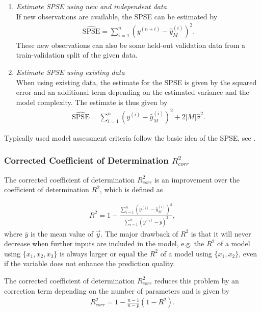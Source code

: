 \begin{enumerate}

	\item \emph{Estimate SPSE using new and independent data} \\	
	If new observations are available, the SPSE can be estimated by
	\begin{align}
		\widehat{\text{SPSE}} = \sum_{i=1}^n \left(y^{(n+i)} - \hat y^{(i)}_M\right)^2.
	\end{align}
	These new observations can also be some held-out validation data from a train-validation split of the given data. 
	
	\item \emph{Estimate SPSE using existing data} \\
	When using existing data, the estimate for the SPSE is given by the squared error and an additional  term depending on the estimated variance and the model complexity. The estimate is thus given by
	\begin{align}
		\widehat{\text{SPSE}} = \sum_{i=1}^n \left(y^{(i)} - \hat y^{(i)}_M\right)^2 + 2\vert M \vert \hat \sigma^2.
	\end{align}

\end{enumerate}

Typically used model assessment criteria follow the basic idea of the SPSE, see \cite{fahrmeir2007regression}.

\subsubsection{Corrected Coefficient of Determination $R_{corr}^2$}

The corrected coefficient of determination $R^2_{corr}$ is an improvement over the coefficient of determination $R^2$, which is defined as 

\begin{align}
	R^2 = 1 - \frac{\sum_{i=1}^n \left( y^{(i)} - \hat y^{(i)}_M \right)^2}{\sum_{i=1}^n \left(y^{(i)} - \bar y\right)^2},
\end{align}
%
where $\bar y$ is the mean value of $\vec{y}$. The major drawback of $R^2$ is that it will never decrease when further inputs are included in the model, e.g. the $R^2$ of a model using $\{x_1, x_2, x_3\}$ is always larger or equal the $R^2$ of a model using $\{x_1, x_2\}$, even if the variable does not enhance the prediction quality. 

The corrected coefficient of determination $R_{corr}^2$ reduces this problem by an correction term depending on the  number of parameters and is given by
\begin{align}
	R_{corr}^2 = 1 - \frac{n-1}{n-p}(1-R^2).
\end{align}

